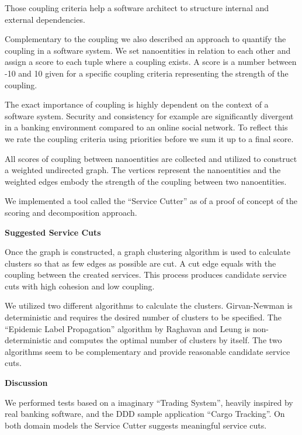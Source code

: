 Those coupling criteria help a software architect to structure internal and external dependencies. 


Complementary to the coupling we also described an approach to quantify the coupling in a software system. We set nanoentities in relation to each other and assign a score to each tuple where a coupling exists. A score is a number between -10 and 10 given for a specific coupling criteria representing the strength of the coupling.

The exact importance of coupling is highly dependent on the context of a software system. Security and consistency for example are significantly divergent in a banking environment compared to an online social network. To reflect this we rate the coupling criteria using priorities before we sum it up to a final score.

All scores of coupling between nanoentities are collected and utilized to construct a weighted undirected graph. The vertices represent the nanoentities and the weighted edges embody the strength of the coupling between two nanoentities.

We implemented a tool called the \enquote{Service Cutter} as of a proof of concept of the scoring and decomposition approach.

\textbf{Suggested Service Cuts}

Once the graph is constructed, a graph clustering algorithm is used to calculate clusters so that as few edges as possible are cut. A cut edge equals with the coupling between the created services. This process produces candidate service cuts with high cohesion and low coupling.

We utilized two different algorithms to calculate the clusters. Girvan-Newman is deterministic and requires the desired number of clusters to be specified. The \enquote{Epidemic Label Propagation} algorithm by Raghavan and Leung is non-deterministic and computes the optimal number of clusters by itself. The two algorithms seem to be complementary and provide reasonable candidate service cuts. 


\textbf{Discussion}

We performed tests based on a imaginary \enquote{Trading System}, heavily inspired by real banking software, and the DDD sample application \enquote{Cargo Tracking}. On both domain models the Service Cutter suggests meaningful service cuts.

